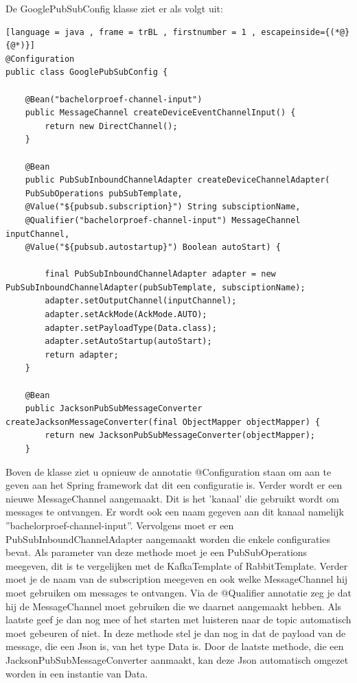 De GooglePubSubConfig klasse ziet er als volgt uit:
\begin{lstlisting}[language = java , frame = trBL , firstnumber = 1 , escapeinside={(*@}{@*)}]
@Configuration
public class GooglePubSubConfig {
    
    @Bean("bachelorproef-channel-input")
    public MessageChannel createDeviceEventChannelInput() {
        return new DirectChannel();
    }
    
    @Bean
    public PubSubInboundChannelAdapter createDeviceChannelAdapter(
    PubSubOperations pubSubTemplate,
    @Value("${pubsub.subscription}") String subsciptionName,
    @Qualifier("bachelorproef-channel-input") MessageChannel inputChannel,
    @Value("${pubsub.autostartup}") Boolean autoStart) {
        
        final PubSubInboundChannelAdapter adapter = new PubSubInboundChannelAdapter(pubSubTemplate, subsciptionName);
        adapter.setOutputChannel(inputChannel);
        adapter.setAckMode(AckMode.AUTO);
        adapter.setPayloadType(Data.class);
        adapter.setAutoStartup(autoStart);
        return adapter;
    }
    
    @Bean
    public JacksonPubSubMessageConverter createJacksonMessageConverter(final ObjectMapper objectMapper) {
        return new JacksonPubSubMessageConverter(objectMapper);
    }
\end{lstlisting}
Boven de klasse ziet u opnieuw de annotatie @Configuration staan om aan te geven aan het Spring framework dat dit een configuratie is. Verder wordt er een nieuwe MessageChannel aangemaakt. Dit is het 'kanaal' die gebruikt wordt om messages te ontvangen. Er wordt ook een naam gegeven aan dit kanaal namelijk ''bachelorproef-channel-input''. Vervolgens moet er een PubSubInboundChannelAdapter aangemaakt worden die enkele configuraties bevat. Als parameter van deze methode moet je een PubSubOperations meegeven, dit is te vergelijken met de KafkaTemplate of RabbitTemplate. Verder moet je de naam van de subscription meegeven en ook welke MessageChannel hij moet gebruiken om messages te ontvangen. Via de @Qualifier annotatie zeg je dat hij de MessageChannel moet gebruiken die we daarnet aangemaakt hebben. Als laatste geef je dan nog mee of het starten met luisteren naar de topic automatisch moet gebeuren of niet. In deze methode stel je dan nog in dat de payload van de message, die een Json is, van het type Data is. Door de laatste methode, die een JacksonPubSubMessageConverter aanmaakt, kan deze Json automatisch omgezet worden in een instantie van Data.
